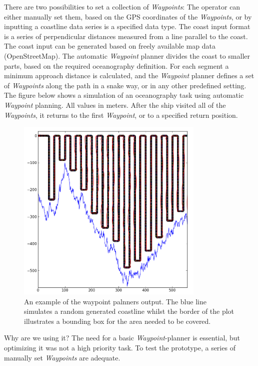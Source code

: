 There are two possibilities to set a collection of \emph{Waypoints}: The operator can either manually set them, based on the GPS coordinates of the \emph{Waypoints}, or by inputting a coastline data series is a specified data type. The coast input format is a series of perpendicular distances measured from a line parallel to the coast. The coast input can be generated based on freely available map data (OpenStreetMap).
The automatic \emph{Waypoint} planner divides the coast to smaller parts, based on the required oceanography definition. For each segment a minimum approach distance is calculated, and the \emph{Waypoint} planner defines a set of \emph{Waypoints} along the path in a snake way, or in any other predefined setting. The figure below shows a simulation of an oceanography task using automatic \emph{Waypoint} planning. All values in meters.
After the ship visited all of the \emph{Waypoints}, it returns to the first \emph{Waypoint}, or to a specified return position.

\begin{figure}
\centering
\includegraphics[width = 0.8\textwidth]{img/LocalPlannerFigures/Auto_WP_Planning.png}
\caption{An example of the waypoint palnners output. The blue line simulates a random generated coastline whilst the border of the plot illustrates a bounding box for the area needed to be covered.}
\label{fig:wp_planner}
\end{figure}

Why are we using it?
The need for a basic \emph{Waypoint}-planner is essential, but optimizing it was not a high priority task. To test the prototype, a series of manually set \emph{Waypoints} are adequate.


